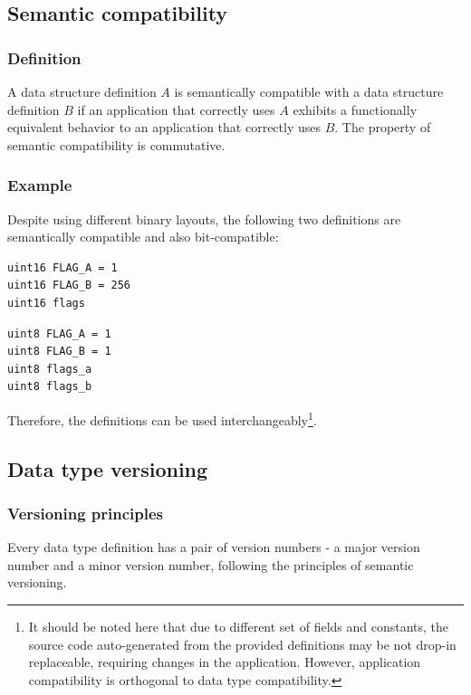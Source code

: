 \subsection{Semantic compatibility}\label{sec:dsdl_semantic_compatibility}

\subsubsection{Definition}

A data structure definition $A$ is semantically compatible with a data structure definition $B$
if an application that correctly uses $A$ exhibits a functionally equivalent behavior to an application
that correctly uses $B$.
The property of semantic compatibility is commutative.

\subsubsection{Example}

Despite using different binary layouts, the following two definitions are semantically compatible
and also bit-compatible:

\begin{verbatim}
uint16 FLAG_A = 1
uint16 FLAG_B = 256
uint16 flags
\end{verbatim}

\begin{verbatim}
uint8 FLAG_A = 1
uint8 FLAG_B = 1
uint8 flags_a
uint8 flags_b
\end{verbatim}

Therefore, the definitions can be used
interchangeably\footnote{It should be noted here that due to different set of fields and constants,
the source code auto-generated from the provided definitions may be not drop-in replaceable,
requiring changes in the application. However, application compatibility is orthogonal to
data type compatibility.}.

\subsection{Data type versioning}

\subsubsection{Versioning principles}

Every data type definition has a pair of version numbers -
a major version number and a minor version number, following the principles of semantic versioning.

